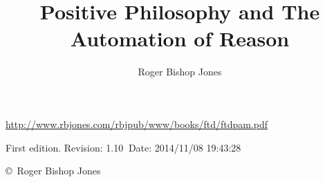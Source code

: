 \documentclass[10pt,a4paper.titlepage,openany,twocolumn]{book}
\author{Roger Bishop Jones}
\title{Positive Philosophy and The Automation of Reason}
\begin{document}
\begin{titlepage}
\maketitle

\vfill

\begin{centering}

{\footnotesize



\href{http://www.rbjones.com/rbjpub/www/books/ftd/ftdpam.pdf}
{http://www.rbjones.com/rbjpub/www/books/ftd/ftdpam.pdf}

First edition. $ $Revision: 1.10 $~$Date: 2014/11/08 19:43:28 $ $

\vspace{0.2in}

\copyright\ Roger Bishop Jones

}%

\end{centering}

\thispagestyle{empty}
\end{titlepage}

\onecolumn


{\parskip=0pt\tableofcontents}

\vfill

\pagebreak

\twocolumn
\end{document}
